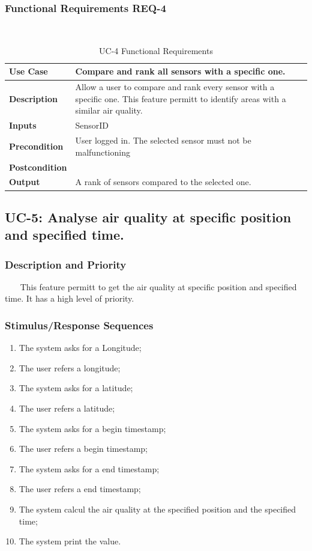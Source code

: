 \documentclass{report}
\begin{document}
\subsubsection*{Functional Requirements REQ-4} ~~~
\begin{table}[H]
	\begin{center}
		\begin{tabular}{|m{4cm}|m{10cm}|}
		\hline
		\textbf{Use Case} & Compare and rank all sensors with a specific one. \\
		\hline
		\textbf{Description} & Allow a user to compare and rank every sensor with a specific one. This feature permitt to identify areas with a similar air quality.  \\
		\hline
		\textbf{Inputs} &  SensorID\\
		\hline
		\textbf{Precondition} & User logged in. The selected sensor must not be malfunctioning \\
		\hline
		\textbf{Postcondition} &  \\
		\hline
		\textbf{Output} & A rank of sensors compared to the selected one. \\
		\hline
		\end{tabular}
	\end{center}
	\caption{UC-4 Functional Requirements}
	\label{table:REQ-4}
\end{table}

\subsection{UC-5: Analyse air quality at specific position and specified time.}

\subsubsection*{Description and Priority} ~~~
This feature permitt to get the air quality at specific position and specified time. It has a high level of priority.

\subsubsection*{Stimulus/Response Sequences}
\begin{enumerate}
	\item The system asks for a Longitude;
	\item The user refers a longitude;
	\item The system asks for a latitude;
	\item The user refers a latitude;
	\item The system asks for a begin timestamp;
	\item The user refers a begin timestamp;
	\item The system asks for a end timestamp;
	\item The user refers a end timestamp;
	\item The system calcul the air quality at the specified position and the specified time;
	\item The system print the value.
\end{enumerate}
\end{document}

